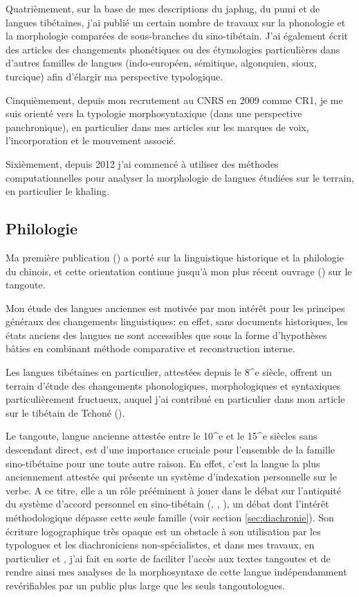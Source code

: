 \documentclass[oldfontcommands,oneside,a4paper,11pt]{article}
\begin{document}
Quatrièmement, sur la base de mes descriptions du japhug, du pumi et de langues tibétaines, j'ai publié un certain nombre de travaux sur la phonologie et la morphologie comparées de sous-branches du sino-tibétain. J'ai également écrit des articles des changements phonétiques ou des étymologies particulières dans d'autres familles de langues (indo-européen, sémitique, algonquien, sioux, turcique) afin d'élargir ma perspective typologique.

Cinquièmement, depuis mon recrutement au CNRS en 2009 comme CR1, je me suis orienté vers la typologie morphosyntaxique (dans une perspective panchronique),  en particulier dans mes articles sur les marques de voix, l'incorporation et le mouvement associé.

Sixièmement, depuis 2012 j'ai commencé à utiliser des méthodes computationnelles pour analyser la morphologie de langues étudiées sur le terrain, en particulier le khaling.

\subsection{Philologie} \label{sec:philologie}
Ma première publication (\citealt{jacques00ywij}) a porté sur la linguistique historique et la philologie du chinois, et cette orientation continue jusqu'à mon plus récent ouvrage (\citealt{jacques14esquisse}) sur le tangoute.

Mon étude des langues anciennes est motivée par mon intérêt pour les principes généraux des changements linguistiques: en effet, sans documents historiques, les états anciens des langues ne sont accessibles que sous la forme d'hypothèses bâties en combinant méthode comparative et reconstruction interne. 

Les langues tibétaines en particulier, attestées depuis le 8^e siècle, offrent un terrain d'étude des changements phonologiques, morphologiques et syntaxiques particulièrement fructueux, auquel j'ai contribué en particulier dans mon article sur le tibétain de Tchoné (\citealt{jacques14cone}).

Le tangoute, langue ancienne attestée entre le 10^{e} et le 15^e siècles sans descendant direct, est d'une importance cruciale pour l'ensemble de la famille sino-tibétaine pour une toute autre raison. En effet, c'est la langue la plus anciennement attestée qui présente un système d'indexation personnelle sur le verbe. A ce titre, elle a un rôle prééminent à jouer dans le débat sur l'antiquité du système d'accord personnel en sino-tibétain (\citealt{jacques09tangutverb}, \citealt{jacques10zos}, \citealt{jacques11tangut.verb}), un débat dont l'intérêt méthodologique dépasse cette seule famille (voir section \ref{sec:diachronie}). Son écriture logographique très opaque est un obstacle à son utilisation par les typologues et les diachroniciens non-spécialistes, et dans mes travaux, en particulier \citet{jacques07textes} et \citet{jacques14esquisse}, j'ai fait en sorte de faciliter l'accès aux textes tangoutes et de rendre ainsi mes analyses de la morphosyntaxe de cette langue indépendamment revérifiables par un public plus large que les seuls tangoutologues.
\end{document}
